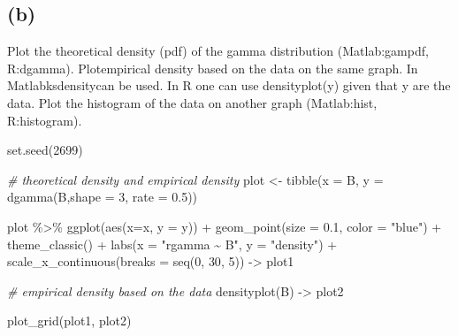 \documentclass[
  10pt,
]{article}
\newenvironment{Shaded}{\begin{snugshade}}{\end{snugshade}}
\newcommand{\AttributeTok}[1]{\textcolor[rgb]{0.77,0.63,0.00}{#1}}
\newcommand{\CommentTok}[1]{\textcolor[rgb]{0.56,0.35,0.01}{\textit{#1}}}
\newcommand{\DecValTok}[1]{\textcolor[rgb]{0.00,0.00,0.81}{#1}}
\newcommand{\FloatTok}[1]{\textcolor[rgb]{0.00,0.00,0.81}{#1}}
\newcommand{\FunctionTok}[1]{\textcolor[rgb]{0.00,0.00,0.00}{#1}}
\newcommand{\NormalTok}[1]{#1}
\newcommand{\OtherTok}[1]{\textcolor[rgb]{0.56,0.35,0.01}{#1}}
\newcommand{\SpecialCharTok}[1]{\textcolor[rgb]{0.00,0.00,0.00}{#1}}
\newcommand{\StringTok}[1]{\textcolor[rgb]{0.31,0.60,0.02}{#1}}
\begin{document}
\newpage

\hypertarget{b-1}{%
\subsection*{(b)}\label{b-1}}

Plot the theoretical density (pdf) of the gamma distribution (Matlab:gampdf, R:dgamma). Plotempirical density based on the data on the same graph. In Matlabksdensitycan be used. In R one can use densityplot(y) given that y are the data. Plot the histogram of the data on another graph (Matlab:hist, R:histogram).

\begin{Shaded}
\begin{Highlighting}[]
\FunctionTok{set.seed}\NormalTok{(}\DecValTok{2699}\NormalTok{)}

\CommentTok{\# theoretical density and empirical density}
\NormalTok{plot }\OtherTok{\textless{}{-}} \FunctionTok{tibble}\NormalTok{(}\AttributeTok{x =}\NormalTok{ B, }\AttributeTok{y =} \FunctionTok{dgamma}\NormalTok{(B,}\AttributeTok{shape =} \DecValTok{3}\NormalTok{, }\AttributeTok{rate =} \FloatTok{0.5}\NormalTok{))}

\NormalTok{plot }\SpecialCharTok{\%\textgreater{}\%}
  \FunctionTok{ggplot}\NormalTok{(}\FunctionTok{aes}\NormalTok{(}\AttributeTok{x=}\NormalTok{x, }\AttributeTok{y =}\NormalTok{ y)) }\SpecialCharTok{+}
  \FunctionTok{geom\_point}\NormalTok{(}\AttributeTok{size =} \FloatTok{0.1}\NormalTok{, }\AttributeTok{color =} \StringTok{"blue"}\NormalTok{) }\SpecialCharTok{+}
  \FunctionTok{theme\_classic}\NormalTok{() }\SpecialCharTok{+}
  \FunctionTok{labs}\NormalTok{(}\AttributeTok{x =} \StringTok{"rgamma \textasciitilde{} B"}\NormalTok{,}
       \AttributeTok{y =} \StringTok{"density"}\NormalTok{) }\SpecialCharTok{+}
  \FunctionTok{scale\_x\_continuous}\NormalTok{(}\AttributeTok{breaks =} \FunctionTok{seq}\NormalTok{(}\DecValTok{0}\NormalTok{, }\DecValTok{30}\NormalTok{, }\DecValTok{5}\NormalTok{)) }\OtherTok{{-}\textgreater{}}\NormalTok{ plot1}

\CommentTok{\# empirical density based on the data}
\FunctionTok{densityplot}\NormalTok{(B) }\OtherTok{{-}\textgreater{}}\NormalTok{ plot2}

\FunctionTok{plot\_grid}\NormalTok{(plot1, plot2)}
\end{Highlighting}
\end{Shaded}
\end{document}
